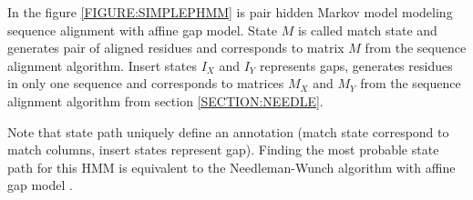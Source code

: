 \begin{example}
In the figure \ref{FIGURE:SIMPLEPHMM} is pair hidden Markov model modeling
sequence alignment with affine gap model. State $M$ is called match state and
generates pair of aligned residues and corresponds to matrix $M$ from the sequence
alignment algorithm. Insert states $I_X$ and $I_Y$ represents gaps,
generates residues in only one sequence and corresponds to matrices $M_X$ and
$M_Y$ from the sequence alignment algorithm from section \ref{SECTION:NEEDLE}.

Note that state path uniquely define an annotation (match state correspond to
match columns, insert states represent gap).  Finding the most probable state
path for this HMM is equivalent to the Needleman-Wunch algorithm with affine gap
model \cite{Durbin1998}.





\end{example}
